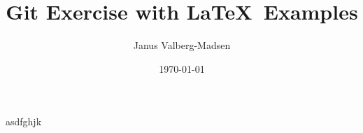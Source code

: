 \documentclass[10pt,a4paper]{article}
\title{Git Exercise with \LaTeX\ Examples}
\author{Janus Valberg-Madsen}
\date{\today}
\begin{document}
\maketitle

\begin{abstract}
  
\end{abstract}

\tableofcontents




asdfghjk
\end{document}
